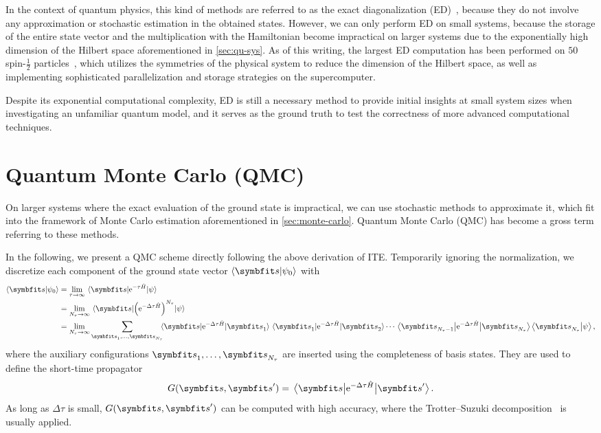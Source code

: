 In the context of quantum physics, this kind of methods are referred to as the exact diagonalization (ED)~\cite{weisse2008exact}, because they do not involve any approximation or stochastic estimation in the obtained states. However, we can only perform ED on small systems, because the storage of the entire state vector and the multiplication with the Hamiltonian become impractical on larger systems due to the exponentially high dimension of the Hilbert space aforementioned in \cref{sec:qu-sys}. As of this writing, the largest ED computation has been performed on $50$ spin-$\frac{1}{2}$ particles~\cite{wietek2018sublattice}, which utilizes the symmetries of the physical system to reduce the dimension of the Hilbert space, as well as implementing sophisticated parallelization and storage strategies on the supercomputer.

Despite its exponential computational complexity, ED is still a necessary method to provide initial insights at small system sizes when investigating an unfamiliar quantum model, and it serves as the ground truth to test the correctness of more advanced computational techniques.

\section{Quantum Monte Carlo (QMC)}
\label{sec:qmc}

On larger systems where the exact evaluation of the ground state is impractical, we can use stochastic methods to approximate it, which fit into the framework of Monte Carlo estimation aforementioned in \cref{sec:monte-carlo}. Quantum Monte Carlo (QMC) has become a gross term referring to these methods.

In the following, we present a QMC scheme directly following the above derivation of ITE. Temporarily ignoring the normalization, we discretize each component of the ground state vector $\ip{\vs}{\psi_0}$ with
\begin{align}
\ip{\vs}{\psi_0} &= \lim_{\tau \to \infty} \mel{\vs}{\rme^{-\tau \hat{H}}}{\psiinit} \\
&= \lim_{N_\tau \to \infty} \mel{\vs}{\edthp^{N_\tau}}{\psiinit} \\
&= \lim_{N_\tau \to \infty} \sum_{\vs_1, \ldots, \vs_{N_\tau}}\!\!\!\!\mel{\vs}{\edth}{\vs_1} \mel{\vs_1}{\edth}{\vs_2} \cdots \mel{\vs_{N_\tau - 1}}{\edth}{\vs_{N_\tau}} \ip{\vs_{N_\tau}}{\psiinit},
\end{align}
where the auxiliary configurations $\vs_1, \ldots, \vs_{N_\tau}$ are inserted using the completeness of basis states. They are used to define the short-time propagator
\begin{equation}
G(\vs, \vs') = \mel{\vs}{\edth}{\vs'}.
\end{equation}
As long as $\Delta \tau$ is small, $G(\vs, \vs')$ can be computed with high accuracy, where the Trotter--Suzuki decomposition~\cite{suzuki1976generalized} is usually applied.

